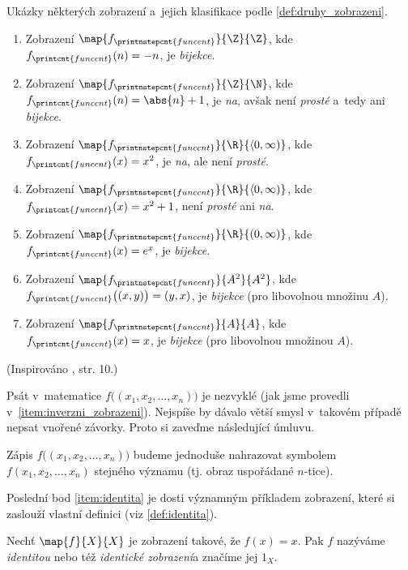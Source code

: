 \begin{example}
    Ukázky některých zobrazení a~jejich klasifikace podle \ref{def:druhy_zobrazeni}.
    \begin{enumerate}[label=(\roman*)]
        \item Zobrazení $\map{f_{\printnstepcnt{funccnt}}}{\Z}{\Z}$, kde $f_{\printcnt{funccnt}}(n)=-n$, je \emph{bijekce}.
        \item Zobrazení $\map{f_{\printnstepcnt{funccnt}}}{\Z}{\N}$, kde $f_{\printcnt{funccnt}}(n)=\abs{n}+1$, je \emph{na}, avšak není \emph{prosté} a~tedy ani \emph{bijekce}.
        \item Zobrazení $\map{f_{\printnstepcnt{funccnt}}}{\R}{\langle 0,\infty)}$, kde $f_{\printcnt{funccnt}}(x)=x^2$, je \emph{na}, ale není \emph{prosté}.
        \item Zobrazení $\map{f_{\printnstepcnt{funccnt}}}{\R}{\langle 0,\infty)}$, kde $f_{\printcnt{funccnt}}(x)=x^2+1$, není \emph{prosté} ani \emph{na}.
        \item Zobrazení $\map{f_{\printnstepcnt{funccnt}}}{\R}{(0,\infty)}$, kde $f_{\printcnt{funccnt}}(x)=e^x$, je \emph{bijekce}.
        \item\label{item:inverzni_zobrazeni} Zobrazení $\map{f_{\printnstepcnt{funccnt}}}{A^2}{A^2}$, kde $f_{\printcnt{funccnt}}\bigl((x,y)\bigr)=(y,x)$, je \emph{bijekce} (pro libovolnou množinu $A$).
        \item\label{item:identita} Zobrazení $\map{f_{\printnstepcnt{funccnt}}}{A}{A}$, kde $f_{\printcnt{funccnt}}(x)=x$, je \emph{bijekce} (pro libovolnou množinou $A$).
    \end{enumerate}
\end{example}
(Inspirováno \cite{Becvar2019}, str. 10.)\par
Psát v~matematice $f\bigl((x_1,x_2,\dots,x_n)\bigr)$ je nezvyklé (jak jsme provedli v~\ref{item:inverzni_zobrazeni}). Nejspíše by dávalo větší smysl v~takovém případě nepsat vnořené závorky. Proto si zaveďme následující úmluvu.
\begin{convention}
    Zápis $f\bigl((x_1,x_2,\dots,x_n)\bigr)$ budeme jednoduše nahrazovat symbolem $f(x_1,x_2,\dots,x_n)$ stejného významu (tj. obraz uspořádané $n$-tice).
\end{convention}
Poslední bod \ref{item:identita} je dosti významným příkladem zobrazení, které si zaslouží vlastní definici (viz \ref{def:identita}).
\begin{definition}[Identita]\label{def:identita}
    Nechť $\map{f}{X}{X}$ je zobrazení takové, že $f(x)=x$. Pak $f$ nazýváme \emph{identitou} nebo též \emph{identické zobrazení}a značíme jej $1_X$.
\end{definition}
